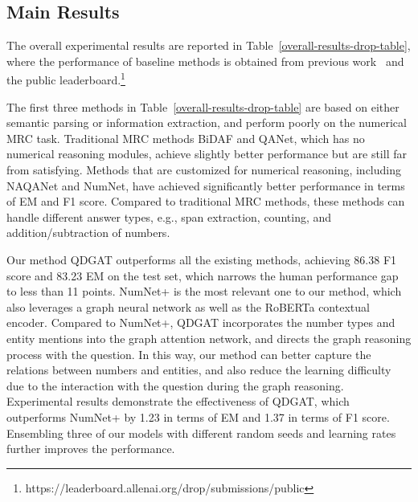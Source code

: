 \documentclass{article}
\begin{document}
\subsection{Main Results}
The overall experimental results are reported in Table~\ref{overall-results-drop-table}, where the performance of baseline methods is obtained from previous work~\cite{DBLP:conf/naacl/DuaWDSS019,Seo2017Bidirectional,DBLP:conf/emnlp/RanLLZL19,DBLP:conf/emnlp/AndorHLP19} and
the public leaderboard.\footnote{https://leaderboard.allenai.org/drop/submissions/public}

The first three methods in Table~\ref{overall-results-drop-table} are based on either semantic parsing or information extraction, and perform poorly on the numerical MRC task.
Traditional MRC methods BiDAF and QANet, which has no numerical reasoning modules, achieve slightly better performance but are still far from satisfying.
Methods that are customized for numerical reasoning, including NAQANet and NumNet, have achieved significantly better performance in terms of EM and F1 score. Compared to traditional MRC methods, these methods can handle different answer types, e.g., span extraction, counting, and addition/subtraction of numbers.




Our method QDGAT outperforms all the existing methods, achieving 86.38 F1 score and 83.23 EM on the test set, which narrows the human performance gap to less than 11 points.
NumNet+ is the most relevant one to our method, which also leverages a graph neural network as well as the RoBERTa contextual encoder. Compared to NumNet+, QDGAT incorporates the number types and entity mentions into the graph attention network, and directs the graph reasoning process with the question. In this way, our method can better capture the relations between numbers and entities, and also reduce the learning difficulty due to the interaction with the question during the graph reasoning.
Experimental results demonstrate the effectiveness of QDGAT, which outperforms NumNet+ by 1.23 in terms of EM and 1.37 in terms of F1 score.
Ensembling three of our models with different random seeds and learning rates further improves the performance.
\end{document}
